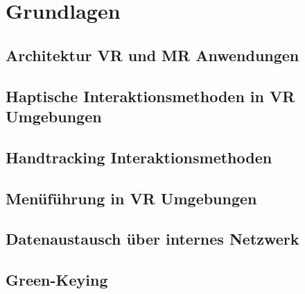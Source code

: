 \section{Grundlagen}
\subsection{Architektur VR und MR Anwendungen}
\subsection{Haptische Interaktionsmethoden in VR Umgebungen}
\subsection{Handtracking Interaktionsmethoden}
\subsection{Menüführung in VR Umgebungen}
\subsection{Datenaustausch über internes Netzwerk}
\subsection{Green-Keying}\label{sec:Green-Keying}
